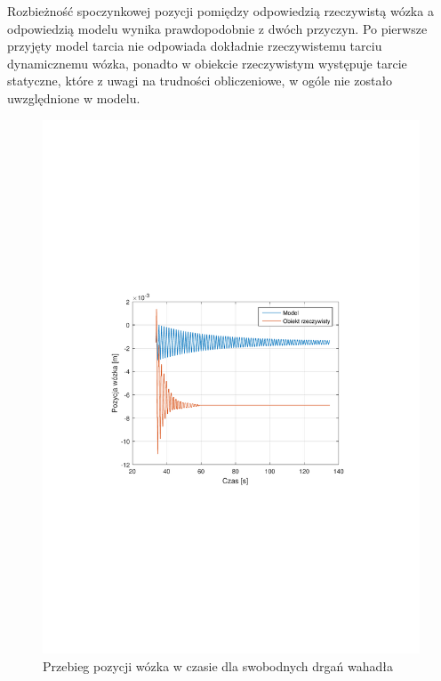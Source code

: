 \documentclass[12pt]{article}
\begin{document}
\newpage

Rozbieżność spoczynkowej pozycji pomiędzy odpowiedzią rzeczywistą wózka a
odpowiedzią modelu wynika prawdopodobnie z dwóch przyczyn. Po pierwsze przyjęty
model tarcia nie odpowiada dokładnie rzeczywistemu tarciu dynamicznemu wózka,
ponadto w obiekcie rzeczywistym występuje tarcie statyczne, które z uwagi na
trudności obliczeniowe, w ogóle nie zostało uwzględnione w modelu.

\begin{figure}[!htb]
    \begin{center}
        \includegraphics[width=16cm,trim=3cm 9cm 3cm 9cm,clip]
        {../res/img/idf1_wozek.pdf}
    \end{center}
    \caption{Przebieg pozycji wózka w czasie dla swobodnych drgań wahadła} 
    \label{rys:idf1_wozek}
\end{figure}
\end{document}
